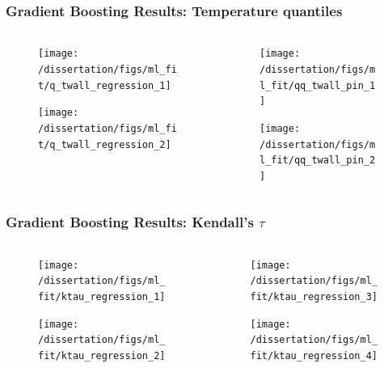 \documentclass[t, pdftex]{beamer}
\begin{document}
\begin{frame}
\frametitle{Gradient Boosting Results: Temperature quantiles}
\vspace{-42pt}
\begin{columns}
    \begin{column}{0.5\textwidth}
        \begin{figure}[H]%
            \texttt{[image: /dissertation/figs/ml\_fit/q\_twall\_regression\_1]}
        \end{figure}
        \vspace{-26pt}
        \begin{figure}[H]%
            \texttt{[image: /dissertation/figs/ml\_fit/q\_twall\_regression\_2]}
        \end{figure}
    \end{column}
    \begin{column}{0.5\textwidth}
        \begin{figure}[H]%
            \texttt{[image: /dissertation/figs/ml\_fit/qq\_twall\_pin\_1]}
        \end{figure}
        \vspace{-26pt}
        \begin{figure}[H]%
            \texttt{[image: /dissertation/figs/ml\_fit/qq\_twall\_pin\_2]}
        \end{figure}
    \end{column}
\end{columns}
\end{frame}

\begin{frame}
\frametitle{Gradient Boosting Results: Kendall's $\tau$}
\vspace{-42pt}
\begin{columns}
    \begin{column}{0.5\textwidth}
        \begin{figure}[H]%
            \texttt{[image: /dissertation/figs/ml\_fit/ktau\_regression\_1]}
        \end{figure}
        \vspace{-26pt}
        \begin{figure}[H]%
            \texttt{[image: /dissertation/figs/ml\_fit/ktau\_regression\_2]}
        \end{figure}
    \end{column}
    \begin{column}{0.5\textwidth}
        \begin{figure}[H]%
            \texttt{[image: /dissertation/figs/ml\_fit/ktau\_regression\_3]}
        \end{figure}
        \vspace{-26pt}
        \begin{figure}[H]%
            \texttt{[image: /dissertation/figs/ml\_fit/ktau\_regression\_4]}
        \end{figure}
    \end{column}
\end{columns}
\end{frame}
\end{document}
